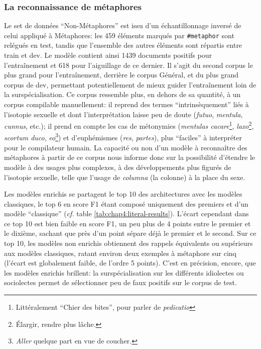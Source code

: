 
\subsubsection{La reconnaissance de métaphores}

Le set de données ``Non-Métaphores'' est issu d'un échantillonnage inversé de celui appliqué à Métaphores: les 459 éléments marqués par \texttt{\#metaphor} sont relégués en test, tandis que l'ensemble des autres éléments sont répartis entre train et dev. Le modèle contient ainsi 1439 documents positifs pour l'entraînement et 618 pour l'aiguillage de ce dernier. Il s'agit du second corpus le plus grand pour l'entraînement, derrière le corpus Général, et du plus grand corpus de dev, permettant potentiellement de mieux guider l'entraînement loin de la surspécialisation. Ce corpus ressemble plus, en dehors de sa quantité, à un corpus compilable manuellement: il reprend des termes ``intrinsèquement'' liés à l'isotopie sexuelle et dont l'interprétation laisse peu de doute (\textit{futuo}, \textit{mentula}, \textit{cunnus}, etc.); il prend en compte les cas de métonymies (\textit{mentulas cacare}\footnote{Littéralement ``Chier des bites'', pour parler de \textit{pedicatio}}, \textit{laxo}\footnote{Élargir, rendre plus lâche.}, \textit{scortum duco}, \textit{eo}\footnote{\textit{Aller} quelque part en vue de coucher.}) et d'euphémismes (\textit{res}, \textit{partes}), plus ``faciles'' à interpréter pour le compilateur humain. La capacité ou non d'un modèle à reconnaître des métaphores à partir de ce corpus nous informe donc sur la possibilité d'étendre le modèle à des usages plus complexes, à des développements plus figurés de l'isotopie sexuelle, telle que l'usage de \textit{columna} (la colonne) à la place du sexe.


Les modèles enrichis se partagent le top 10 des architectures avec les modèles classiques, le top 6 en score F1 étant composé uniquement des premiers et d'un modèle ``classique'' (\textit{cf.} table \ref{tab:chap4:literal-results}). L'écart cependant dans ce top 10 est bien faible en score F1, un peu plus de 4 points entre le premier et le dixième, sachant que près d'un point sépare déjà le premier et le second. Sur ce top 10, les modèles non enrichis obtiennent des rappels équivalents ou supérieurs aux modèles classiques, ratant environ deux exemples à métaphore sur cinq (l'écart est globalement faible, de l'ordre 5 points). C'est en précision, encore, que les modèles enrichis brillent: la surspécialisation sur les différents idiolectes ou sociolectes permet de sélectionner peu de faux positifs sur le corpus de test.

